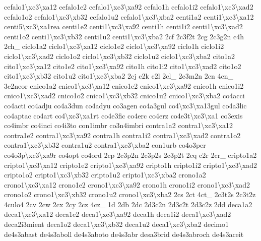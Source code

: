 \begin{DoxyCompactItemize}
cefalo1\textbackslash{}xc3\textbackslash{}xa12 cefalo1e2 cefalo1\textbackslash{}xc3\textbackslash{}xa92 cefalo1h cefalo1i2 cefalo1\textbackslash{}xc3\textbackslash{}xad2 cefalo1o2 cefalo1\textbackslash{}xc3\textbackslash{}xb32 cefalo1u2 cefalo1\textbackslash{}xc3\textbackslash{}xba2 centi1a2 centi1\textbackslash{}xc3\textbackslash{}xa12 centi5\textbackslash{}xc3\textbackslash{}xa1rea centi1e2 centi1\textbackslash{}xc3\textbackslash{}xa92 centi1h centi1i2 centi1\textbackslash{}xc3\textbackslash{}xad2 centi1o2 centi1\textbackslash{}xc3\textbackslash{}xb32 centi1u2 centi1\textbackslash{}xc3\textbackslash{}xba2 2cf 2c3f2t 2cg 2c3g2n c4h 2ch\-\_\- ciclo1a2 ciclo1\textbackslash{}xc3\textbackslash{}xa12 ciclo1e2 ciclo1\textbackslash{}xc3\textbackslash{}xa92 ciclo1h ciclo1i2 ciclo1\textbackslash{}xc3\textbackslash{}xad2 ciclo1o2 ciclo1\textbackslash{}xc3\textbackslash{}xb32 ciclo1u2 ciclo1\textbackslash{}xc3\textbackslash{}xba2 cito1a2 cito1\textbackslash{}xc3\textbackslash{}xa12 cito1e2 cito1\textbackslash{}xc3\textbackslash{}xa92 cito1h cito1i2 cito1\textbackslash{}xc3\textbackslash{}xad2 cito1o2 cito1\textbackslash{}xc3\textbackslash{}xb32 cito1u2 cito1\textbackslash{}xc3\textbackslash{}xba2 2cj c2k c2l 2cl\-\_\- 2cm 2c3m2n 2cn 4cn\-\_\- 3c2neor cnico1a2 cnico1\textbackslash{}xc3\textbackslash{}xa12 cnico1e2 cnico1\textbackslash{}xc3\textbackslash{}xa92 cnico1h cnico1i2 cnico1\textbackslash{}xc3\textbackslash{}xad2 cnico1o2 cnico1\textbackslash{}xc3\textbackslash{}xb32 cnico1u2 cnico1\textbackslash{}xc3\textbackslash{}xba2 co4acci co4acti co4adju co4a3dun co4adyu co3agen co4a3gul co4\textbackslash{}xc3\textbackslash{}xa13gul co4a3lic co4aptac co4art co4\textbackslash{}xc3\textbackslash{}xa1rt co4e3fic co4erc co4erz co4e3t\textbackslash{}xc3\textbackslash{}xa1 co3exis co4imbr co4inci co4i3to con1imbr co3n4imbri contra1a2 contra1\textbackslash{}xc3\textbackslash{}xa12 contra1e2 contra1\textbackslash{}xc3\textbackslash{}xa92 contra1h contra1i2 contra1\textbackslash{}xc3\textbackslash{}xad2 contra1o2 contra1\textbackslash{}xc3\textbackslash{}xb32 contra1u2 contra1\textbackslash{}xc3\textbackslash{}xba2 con1urb co4o3per co4o3p\textbackslash{}xc3\textbackslash{}xa9r co4opt co4ord 2cp 2c3p2n 2c3p2s 2c3p2t 2cq c2r 2cr\-\_\- cripto1a2 cripto1\textbackslash{}xc3\textbackslash{}xa12 cripto1e2 cripto1\textbackslash{}xc3\textbackslash{}xa92 cripto1h cripto1i2 cripto1\textbackslash{}xc3\textbackslash{}xad2 cripto1o2 cripto1\textbackslash{}xc3\textbackslash{}xb32 cripto1u2 cripto1\textbackslash{}xc3\textbackslash{}xba2 crono1a2 crono1\textbackslash{}xc3\textbackslash{}xa12 crono1e2 crono1\textbackslash{}xc3\textbackslash{}xa92 crono1h crono1i2 crono1\textbackslash{}xc3\textbackslash{}xad2 crono1o2 crono1\textbackslash{}xc3\textbackslash{}xb32 crono1u2 crono1\textbackslash{}xc3\textbackslash{}xba2 2cs 2ct 4ct\-\_\- 2c3t2s 2c3t2z 4culo4 2cv 2cw 2cx 2cy 2cz 4cz\-\_\- 1d 2db 2dc 2d3c2n 2d3c2t 2d3c2z 2dd deca1a2 deca1\textbackslash{}xc3\textbackslash{}xa12 deca1e2 deca1\textbackslash{}xc3\textbackslash{}xa92 deca1h deca1i2 deca1\textbackslash{}xc3\textbackslash{}xad2 deca2i3mient deca1o2 deca1\textbackslash{}xc3\textbackslash{}xb32 deca1u2 deca1\textbackslash{}xc3\textbackslash{}xba2 decimo1 de4s3abast de4s3aboll de4s3aboto de4s3abr desa3brid de4s3abroch de4s3aceit 
\end{DoxyCompactItemize}
